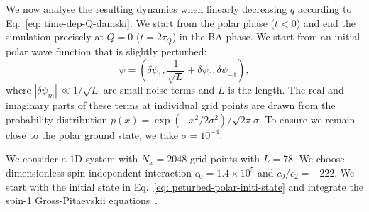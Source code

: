 We now analyse the resulting dynamics when linearly decreasing \( q \) according
to Eq.~\eqref{eq: time-dep-Q-damski}.
We start from the polar phase (\( t < 0 \)) and end the simulation precisely at
\( Q = 0 \) (\( t=2\tau_Q \)) in the BA phase.
We start from an initial polar wave function that is slightly perturbed:
\begin{equation}
    \psi = \left(\delta\psi_1, \frac{1}{\sqrt{L}} + \delta\psi_0,
    \delta\psi_{-1}\right),
    \label{eq: peturbed-polar-initi-state}
\end{equation}
where \( |\delta\psi_m| \ll 1 / \sqrt{L} \) are small noise terms and \( L \) is
the length.
The real and imaginary parts of these terms at individual grid points are drawn
from the probability distribution
\( p(x) = \exp(-x^2/2\sigma^2)/\sqrt{2\pi}\sigma \).
To ensure we remain close to the polar ground state, we take
\( \sigma=10^{-4} \).

We consider a 1D system with \(N_x = 2048\) grid points with \(L=78\).
We choose dimensionless spin-independent interaction \(c_0=1.4\times10^5\) and
\(c_0/c_2 = -222\).
We start with the initial state in Eq.~\eqref{eq: peturbed-polar-initi-state}
and integrate the spin-1 Gross-Pitaevskii equations~\cite{Symes2016}.

